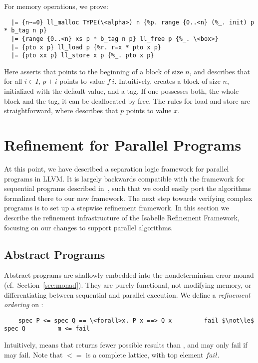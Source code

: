 \documentclass[a4paper,UKenglish,cleveref, autoref, thm-restate]{lipics-v2021}
\begin{document}
  For memory operations, we prove:
  \begin{lstlisting}
  |= {n~=0} ll_malloc TYPE(\<alpha>) n {%p. range {0..<n} (%_. init) p * b_tag n p}
  |= {range {0..<n} xs p * b_tag n p} ll_free p {%_. \<box>}
  |= {pto x p} ll_load p {%r. r=x * pto x p}
  |= {pto xx p} ll_store x p {%_. pto x p}
  \end{lstlisting}
  Here  asserts that  points to the beginning of a block of size \is$n$, and
   describes that for all $i\in I$, $p+i$ points to value $f~i$.
  Intuitively,  creates a block of size $n$, initialized with the default  value,
  and a tag. If one possesses both, the whole block and the tag, it can be deallocated by free.
  The rules for load and store are straightforward, where  describes that $p$ points to value $x$.


  \section{Refinement for Parallel Programs}\label{sec:refine_parallel}
  At this point, we have described a separation logic framework for parallel programs in LLVM.
  It is largely backwards compatible with the framework for sequential programs described in~\cite{La19-llvm},
  such that we could easily port the algorithms formalized there to our new framework.
  The next step towards verifying complex programs is to set up a stepwise refinement framework.
  In this section we describe the refinement infrastructure of the
  Isabelle Refinement Framework, focusing on our changes to support parallel algorithms.

  \subsection{Abstract Programs}
  Abstract programs are shallowly embedded into the nondeterminism error monad  (cf.\ Section~\ref{sec:monad}).
  They are purely functional, not modifying memory, or differentiating between sequential and parallel execution.
  We define a \emph{refinement ordering} on :
  \begin{lstlisting}
    spec P <= spec Q == \<forall>x. P x ==> Q x         fail $\not\le$ spec Q         m <= fail
  \end{lstlisting}
  Intuitively,  means
  that  returns fewer possible results than , and may only fail if  may fail.
  Note that \is$<=$ is a complete lattice, with top element \is$fail$.
\end{document}
